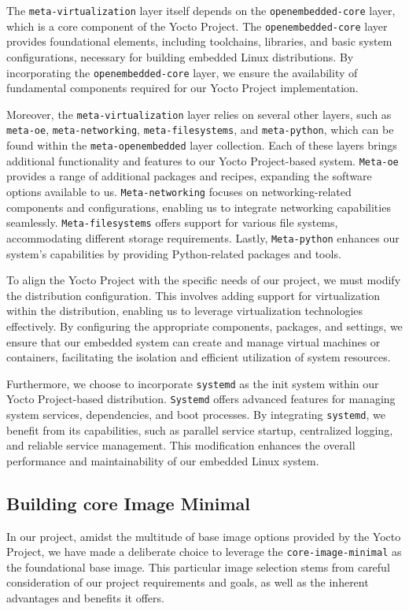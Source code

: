 \documentclass[
12pt,
oneside, 
onehalfspacing, 
nolistspacing, 
parskip, 
chapterinoneline, 
]{AASTCOMPUTER}
\begin{document}
The \texttt{meta-virtualization} layer itself depends on the \texttt{openembedded-core} layer, which is a core component of the Yocto Project. The \texttt{openembedded-core} layer provides foundational elements, including toolchains, libraries, and basic system configurations, necessary for building embedded Linux distributions. By incorporating the \texttt{openembedded-core} layer, we ensure the availability of fundamental components required for our Yocto Project implementation.

Moreover, the \texttt{meta-virtualization} layer relies on several other layers, such as \texttt{meta-oe}, \texttt{meta-networking}, \texttt{meta-filesystems}, and \texttt{meta-python}, which can be found within the \texttt{meta-openembedded} layer collection. Each of these layers brings additional functionality and features to our Yocto Project-based system. \texttt{Meta-oe} provides a range of additional packages and recipes, expanding the software options available to us. \texttt{Meta-networking} focuses on networking-related components and configurations, enabling us to integrate networking capabilities seamlessly. \texttt{Meta-filesystems} offers support for various file systems, accommodating different storage requirements. Lastly, \texttt{Meta-python} enhances our system's capabilities by providing Python-related packages and tools.

To align the Yocto Project with the specific needs of our project, we must modify the distribution configuration. This involves adding support for virtualization within the distribution, enabling us to leverage virtualization technologies effectively. By configuring the appropriate components, packages, and settings, we ensure that our embedded system can create and manage virtual machines or containers, facilitating the isolation and efficient utilization of system resources.

Furthermore, we choose to incorporate \texttt{systemd} as the init system within our Yocto Project-based distribution. \texttt{Systemd} offers advanced features for managing system services, dependencies, and boot processes. By integrating \texttt{systemd}, we benefit from its capabilities, such as parallel service startup, centralized logging, and reliable service management. This modification enhances the overall performance and maintainability of our embedded Linux system.

\subsection{Building core Image Minimal}
In our project, amidst the multitude of base image options provided by the Yocto Project, we have made a deliberate choice to leverage the \texttt{core-image-minimal} as the foundational base image. This particular image selection stems from careful consideration of our project requirements and goals, as well as the inherent advantages and benefits it offers.
\end{document}
